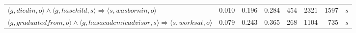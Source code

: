 \begin{tabular}{lrrrrrrl}
               $\langle g, diedin, o \rangle \wedge \langle g, haschild, s \rangle \Rightarrow \langle s, wasbornin , o \rangle$ &          0.010 &              0.196 &              0.284 &                             454 &                        2321 &                            1597 &        $s$ \\
$\langle g, graduatedfrom, o \rangle \wedge \langle g, hasacademicadvisor, s \rangle \Rightarrow \langle s, worksat , o \rangle$ &          0.079 &              0.243 &              0.365 &                             268 &                        1104 &                             735 &        $s$ \\
\bottomrule
\end{tabular}
